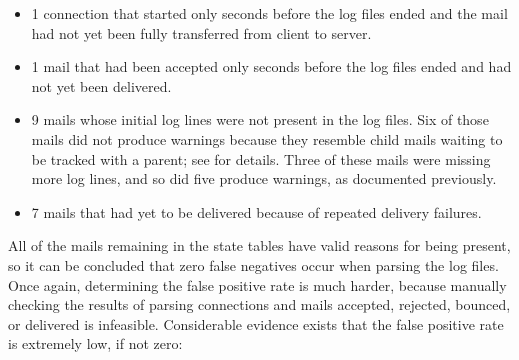 \begin{itemize}

    \squeezeitems{}

    \item 1 connection that started only seconds before the log files ended
        and the mail had not yet been fully transferred from client to
        server.

    \item 1 mail that had been accepted only seconds before the log files
        ended and had not yet been delivered.

    \item 9 mails whose initial log lines were not present in the log
        files.  Six of those mails did not produce warnings because they
        resemble child mails waiting to be tracked with a parent; see
         for details.  Three of these mails
        were missing more log lines, and so did five produce warnings, as
        documented previously.

    \item 7 mails that had yet to be delivered because of repeated
        delivery failures.

\end{itemize}

All of the mails remaining in the state tables have valid reasons for being
present, so it can be concluded that zero false negatives occur when
parsing the \numberOFlogFILES{} log files.  Once again, determining the
false positive rate is much harder, because manually checking the results
of parsing \numberOFconnectionsINlogFILES{} connections and mails accepted,
rejected, bounced, or delivered is infeasible.  Considerable evidence
exists that the false positive rate is extremely low, if not zero:

